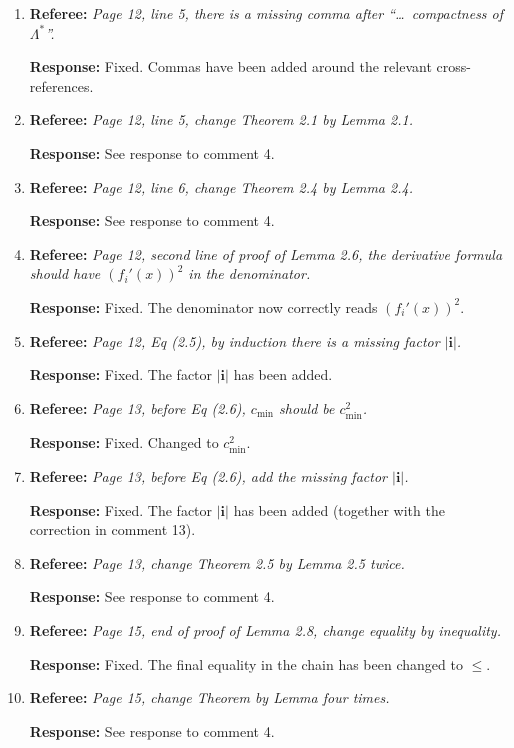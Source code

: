 \documentclass[11pt]{article}
\newcommand{\referee}[1]{\textbf{Referee:} \textit{#1}}
\newcommand{\response}[1]{\textbf{Response:} #1}
\begin{document}
\begin{enumerate}
  \item \referee{Page 12, line 5, there is a missing comma after ``\ldots\ compactness of $\Lambda^*$''.}

  \response{Fixed. Commas have been added around the relevant cross-references.}

  \item \referee{Page 12, line 5, change Theorem 2.1 by Lemma 2.1.}

  \response{See response to comment 4.}

  \item \referee{Page 12, line 6, change Theorem 2.4 by Lemma 2.4.}

  \response{See response to comment 4.}

  \item \referee{Page 12, second line of proof of Lemma 2.6, the derivative formula should have $(f_i'(x))^2$ in the denominator.}

  \response{Fixed. The denominator now correctly reads $(f_i'(x))^2$.}

  \item \referee{Page 12, Eq (2.5), by induction there is a missing factor $|\mathbf{i}|$.}

  \response{Fixed. The factor $|\mathbf{i}|$ has been added.}

  \item \referee{Page 13, before Eq (2.6), $c_{\min}$ should be $c_{\min}^2$.}

  \response{Fixed. Changed to $c_{\min}^2$.}

  \item \referee{Page 13, before Eq (2.6), add the missing factor $|\mathbf{i}|$.}

  \response{Fixed. The factor $|\mathbf{i}|$ has been added (together with the correction in comment 13).}

  \item \referee{Page 13, change Theorem 2.5 by Lemma 2.5 twice.}

  \response{See response to comment 4.}

  \item \referee{Page 15, end of proof of Lemma 2.8, change equality by inequality.}

  \response{Fixed. The final equality in the chain has been changed to $\leq$.}

  \item \referee{Page 15, change Theorem by Lemma four times.}

  \response{See response to comment 4.}


\end{enumerate}
\end{document}
